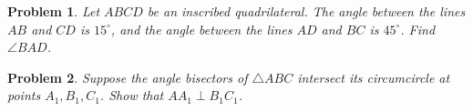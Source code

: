 \documentclass[a4paper,12pt]{article}
\theoremstyle{perfect}
\newtheorem{prb}{Problem}
\begin{document}
\begin{prb}
Let $ABCD$ be an inscribed quadrilateral. The angle between the lines $AB$ and $CD$ is $15^\circ$, and the angle between the lines $AD$ and $BC$ is $45^\circ$. Find $\angle BAD$.
\end{prb}

\begin{prb}
Suppose the angle bisectors of $\triangle ABC$ intersect its circumcircle at points $A_1, B_1, C_1$. Show that $AA_1 \perp B_1C_1$.
\end{prb}
\end{document}
